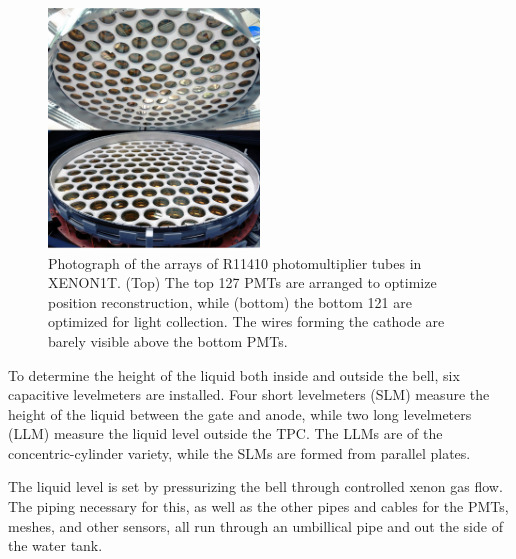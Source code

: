 \begin{figure}[htb]
    \includegraphics[width=0.5\textwidth]{figures/xe1t/pmt_arrays}
    \caption{Photograph of the arrays of R11410 photomultiplier tubes in XENON1T. (Top) The top 127 PMTs are arranged to optimize position reconstruction, while (bottom) the bottom 121 are optimized for light collection. The wires forming the cathode are barely visible above the bottom PMTs.}\label{fig:pmt_arrays}
\end{figure}

To determine the height of the liquid both inside and outside the bell, six capacitive levelmeters are installed. Four short levelmeters (SLM) measure the height of the liquid between the gate and anode, while two long levelmeters (LLM) measure the liquid level outside the TPC. The LLMs are of the concentric-cylinder variety, while the SLMs are formed from parallel plates.

The liquid level is set by pressurizing the bell through controlled xenon gas flow. The piping necessary for this, as well as the other pipes and cables for the PMTs, meshes, and other sensors, all run through an umbillical pipe and out the side of the water tank.